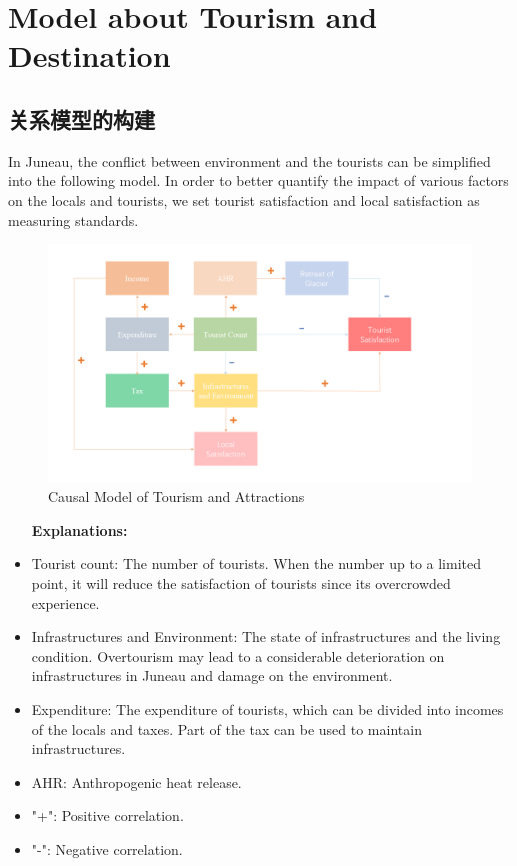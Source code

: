 \documentclass[12pt]{article}  %
\begin{document}
 \section{Model about Tourism and Destination}
 \subsection{关系模型的构建}
 In Juneau, the conflict between environment and the tourists can be simplified into the following model. In order to better quantify the impact of various factors on the locals and tourists, we set tourist satisfaction and local satisfaction as measuring standards.
 
 \begin{figure}[htbp]  %
 
    \centering  %
    \includegraphics[width=1.2\textwidth]{chart1.png} %
    \caption{Causal Model of Tourism and Attractions} %
    \label{fig1}%
    \end{figure}
 

 \begin{itemize}
     \setlength{\parsep}{0ex} %
     \setlength{\topsep}{2ex} %
     \setlength{\itemsep}{1ex} %
 \item [\textbf{Explanations:}] 
        \item Tourist count: The number of tourists. When the number up to a limited point, it will reduce the satisfaction of tourists since its overcrowded experience.
        \item Infrastructures and Environment: The state of infrastructures and the living condition. Overtourism may lead to a considerable deterioration on infrastructures in Juneau and damage on the environment.
        \item Expenditure: The expenditure of tourists, which can be divided into incomes of the locals and taxes. Part of the tax can be used to maintain infrastructures.
        \item AHR: Anthropogenic heat release.
        \item "+": Positive correlation.
        \item "-": Negative correlation.\\
 \end{itemize}
\end{document}
